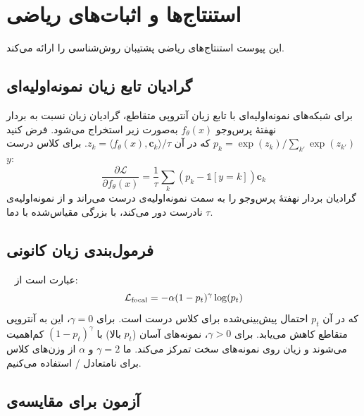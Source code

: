 \chapter{استنتاج‌ها و اثبات‌های ریاضی}
\label{app:math_derivations}

این پیوست استنتاج‌های ریاضی پشتیبان روش‌شناسی را ارائه می‌کند.

\section{گرادیان تابع زیان نمونه‌اولیه‌ای}

برای شبکه‌های نمونه‌اولیه‌ای با تابع زیان آنتروپی متقاطع، گرادیان زیان نسبت به بردار نهفتۀ پرس‌وجو $f_\theta(x)$ به‌صورت زیر استخراج می‌شود. فرض کنید $p_k = \exp(z_k) / \sum_{k'} \exp(z_{k'})$ که در آن $z_k = \langle f_\theta(x), \mathbf{c}_k \rangle / \tau$. برای کلاس درست $y$:
\begin{equation}
\frac{\partial \mathcal{L}}{\partial f_\theta(x)} = \frac{1}{\tau} \sum_k (p_k - \mathbb{1}[y=k]) \mathbf{c}_k
\end{equation}
گرادیان بردار نهفتۀ پرس‌وجو را به سمت نمونه‌اولیه‌ی درست می‌راند و از نمونه‌اولیه‌ی نادرست دور می‌کند، با بزرگی مقیاس‌شده با دما $\tau$.

\section{\texorpdfstring{فرمول‌بندی زیان کانونی }{فرمول‌بندی زیان کانونی (Focal Loss)}}

~\cite{lin2017focal} عبارت است از:
\begin{equation}
\mathcal{L}_{\text{focal}} = -\alpha (1-p_t)^\gamma \log(p_t)
\end{equation}
که در آن $p_t$ احتمال پیش‌بینی‌شده برای کلاس درست است. برای $\gamma = 0$، این به آنتروپی متقاطع کاهش می‌یابد. برای $\gamma > 0$، نمونه‌های آسان ($p_t$ بالا) با $(1-p_t)^\gamma$ کم‌اهمیت می‌شوند و زیان روی نمونه‌های سخت تمرکز می‌کند. ما $\gamma = 2$ و $\alpha$ از وزن‌های کلاس برای نامتعادل / استفاده می‌کنیم.

\section{آزمون  برای مقایسه‌ی }

